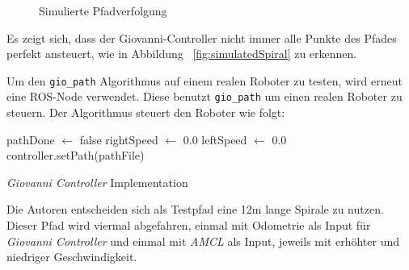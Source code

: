 \documentclass[11pt,a4paper]{article}
\begin{document}
{\begin{figure}[h]
{	}
	\caption{Simulierte Pfadverfolgung}

\end{figure}
Es zeigt sich, dass der Giovanni-Controller nicht immer alle Punkte des Pfades perfekt ansteuert, wie in Abbildung ~\ref{fig:simulatedSpiral} zu erkennen.  


\newpage
Um den \texttt{gio\_path} Algorithmus auf einem realen Roboter zu testen, wird erneut eine ROS-Node verwendet. Diese benutzt  \texttt{gio\_path} um einen realen Roboter zu steuern. Der Algorithmus steuert den Roboter wie folgt: 

\begin{algorithm}
	pathDone $\leftarrow$ false\;
	rightSpeed $\leftarrow$ 0.0\;
	leftSpeed $\leftarrow$ 0.0\;
	controller.setPath(pathFile)\;
\caption{\textit{Giovanni Controller} Implementation}
\end{algorithm}

Die Autoren entscheiden sich als Testpfad eine 12m lange Spirale zu nutzen. Dieser Pfad wird viermal abgefahren, einmal mit Odometrie als Input f\"ur \textit{Giovanni Controller} und einmal mit \textit{AMCL} als Input, jeweils mit erh\"ohter und niedriger Geschwindigkeit.

}
\end{document}
